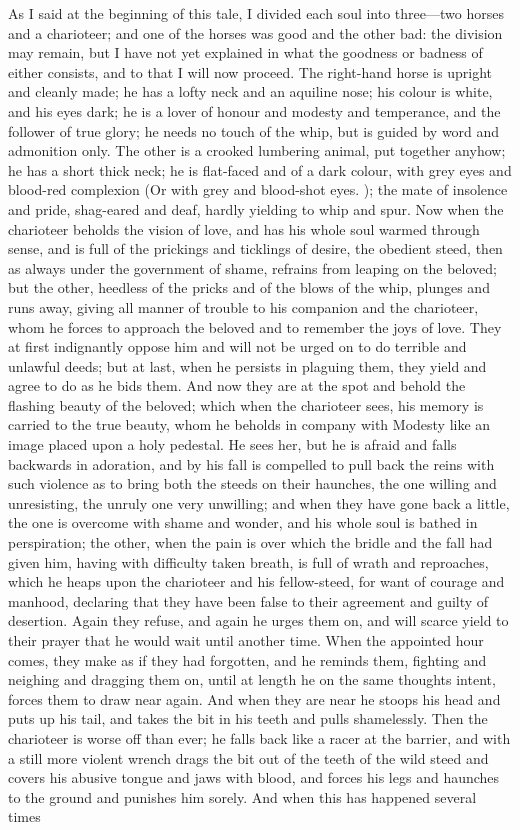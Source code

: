 \documentclass[11pt,letter]{article}
\begin{document}
\par  As I said at the beginning of this tale, I divided each soul into three—two horses and a charioteer; and one of the horses was good and the other bad: the division may remain, but I have not yet explained in what the goodness or badness of either consists, and to that I will now proceed. The right-hand horse is upright and cleanly made; he has a lofty neck and an aquiline nose; his colour is white, and his eyes dark; he is a lover of honour and modesty and temperance, and the follower of true glory; he needs no touch of the whip, but is guided by word and admonition only. The other is a crooked lumbering animal, put together anyhow; he has a short thick neck; he is flat-faced and of a dark colour, with grey eyes and blood-red complexion (Or with grey and blood-shot eyes. ); the mate of insolence and pride, shag-eared and deaf, hardly yielding to whip and spur. Now when the charioteer beholds the vision of love, and has his whole soul warmed through sense, and is full of the prickings and ticklings of desire, the obedient steed, then as always under the government of shame, refrains from leaping on the beloved; but the other, heedless of the pricks and of the blows of the whip, plunges and runs away, giving all manner of trouble to his companion and the charioteer, whom he forces to approach the beloved and to remember the joys of love. They at first indignantly oppose him and will not be urged on to do terrible and unlawful deeds; but at last, when he persists in plaguing them, they yield and agree to do as he bids them. And now they are at the spot and behold the flashing beauty of the beloved; which when the charioteer sees, his memory is carried to the true beauty, whom he beholds in company with Modesty like an image placed upon a holy pedestal. He sees her, but he is afraid and falls backwards in adoration, and by his fall is compelled to pull back the reins with such violence as to bring both the steeds on their haunches, the one willing and unresisting, the unruly one very unwilling; and when they have gone back a little, the one is overcome with shame and wonder, and his whole soul is bathed in perspiration; the other, when the pain is over which the bridle and the fall had given him, having with difficulty taken breath, is full of wrath and reproaches, which he heaps upon the charioteer and his fellow-steed, for want of courage and manhood, declaring that they have been false to their agreement and guilty of desertion. Again they refuse, and again he urges them on, and will scarce yield to their prayer that he would wait until another time. When the appointed hour comes, they make as if they had forgotten, and he reminds them, fighting and neighing and dragging them on, until at length he on the same thoughts intent, forces them to draw near again. And when they are near he stoops his head and puts up his tail, and takes the bit in his teeth and pulls shamelessly. Then the charioteer is worse off than ever; he falls back like a racer at the barrier, and with a still more violent wrench drags the bit out of the teeth of the wild steed and covers his abusive tongue and jaws with blood, and forces his legs and haunches to the ground and punishes him sorely. And when this has happened several times 
\end{document}
